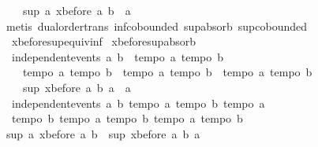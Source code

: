 \begin{isabellebody}
\ \ \ \ sup\ a\ {\isacharparenleft}xbefore\ a\ b{\isacharparenright}\ {\isacharequal}\ a{\isachardoublequoteclose}\isanewline
%
\isadelimproof
%
\endisadelimproof
%
\isatagproof
{}\isamarkupfalse%
\ {\isacharparenleft}metis\ dual{\isacharunderscore}order{\isachardot}trans\ inf{\isachardot}cobounded{}\ sup{\isachardot}absorb{}\ sup{\isachardot}cobounded{}\ \isanewline
\ \ xbefore{\isacharunderscore}sup{\isacharunderscore}equiv{\isacharunderscore}inf{\isacharparenright}%
\endisatagproof
{\isafoldproof}%
%
\isadelimproof
\isanewline
%
\endisadelimproof
\isanewline
{}\isamarkupfalse%
\ xbefore{\isacharunderscore}sup{\isacharunderscore}absorb{\isacharunderscore}{}{\isacharcolon}\ \isanewline
\ \ {\isachardoublequoteopen}independent{\isacharunderscore}events\ a\ b\ {\isasymLongrightarrow}\ {\isasymlbrakk}tempo{}\ a{\isacharsemicolon}\ tempo{}\ b{\isasymrbrakk}\ {\isasymLongrightarrow}\ \isanewline
\ \ \ \ {\isasymlbrakk}tempo{}\ a{\isacharsemicolon}\ tempo{}\ b{\isasymrbrakk}\ {\isasymLongrightarrow}\ {\isasymlbrakk}tempo{}\ a{\isacharsemicolon}\ tempo{}\ b{\isasymrbrakk}\ {\isasymLongrightarrow}\ {\isasymlbrakk}tempo{}\ a{\isacharsemicolon}\ tempo{}\ b{\isasymrbrakk}\ {\isasymLongrightarrow}\isanewline
\ \ \ \ sup\ {\isacharparenleft}xbefore\ a\ b{\isacharparenright}\ a\ {\isacharequal}\ a{\isachardoublequoteclose}\isanewline
%
\isadelimproof
%
\endisadelimproof
%
\isatagproof
{}\isamarkupfalse%
{\isacharminus}\isanewline
\ \ \isamarkupfalse%
\ {}{\isacharcolon}\ {\isachardoublequoteopen}independent{\isacharunderscore}events\ a\ b{\isachardoublequoteclose}\ {\isachardoublequoteopen}tempo{}\ a{\isachardoublequoteclose}\ {\isachardoublequoteopen}tempo{}\ b{\isachardoublequoteclose}\ {\isachardoublequoteopen}tempo{}\ a{\isachardoublequoteclose}\ \isanewline
\ \ {\isachardoublequoteopen}tempo{}\ b{\isachardoublequoteclose}\ {\isachardoublequoteopen}tempo{}\ a{\isachardoublequoteclose}\ {\isachardoublequoteopen}tempo{}\ b{\isachardoublequoteclose}\ {\isachardoublequoteopen}tempo{}\ a{\isachardoublequoteclose}\ {\isachardoublequoteopen}tempo{}\ b{\isachardoublequoteclose}\isanewline
\ \ \isamarkupfalse%
\ {\isachardoublequoteopen}sup\ a\ {\isacharparenleft}xbefore\ a\ b{\isacharparenright}\ {\isacharequal}\ sup\ {\isacharparenleft}xbefore\ a\ b{\isacharparenright}\ a{\isachardoublequoteclose}\ \isanewline

\end{isabellebody}
